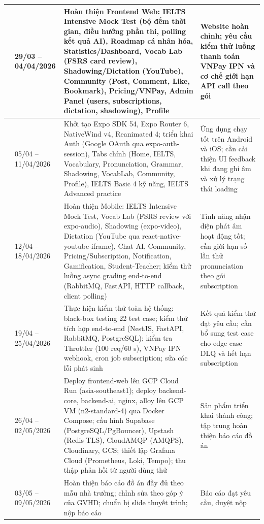 \begin{longtable}{|>{\centering\arraybackslash}p{15\tbu}|p{28\tbu}|p{62\tbu}|p{40\tbu}|}
    10 & 29/03 -- 04/04/2026 & Hoàn thiện Frontend Web: IELTS Intensive Mock Test (bộ đếm thời gian, điều hướng phần thi, polling kết quả AI), Roadmap cá nhân hóa, Statistics/Dashboard, Vocab Lab (FSRS card review), Shadowing/Dictation (YouTube), Community (Post, Comment, Like, Bookmark), Pricing/VNPay, Admin Panel (users, subscriptions, dictation, shadowing), Profile & Website hoàn chỉnh; yêu cầu kiểm thử luồng thanh toán VNPay IPN và cơ chế giới hạn API call theo gói \\ \hline
    11 & 05/04 -- 11/04/2026 & Khởi tạo Expo SDK 54, Expo Router 6, NativeWind v4, Reanimated 4; triển khai Auth (Google OAuth qua expo-auth-session), Tabs chính (Home, IELTS, Vocabulary, Pronunciation, Grammar, Shadowing, VocabLab, Community, Profile), IELTS Basic 4 kỹ năng, IELTS Advanced practice & Ứng dụng chạy tốt trên Android và iOS; cần cải thiện UI feedback khi đang ghi âm và xử lý trạng thái loading \\ \hline
    12 & 12/04 -- 18/04/2026 & Hoàn thiện Mobile: IELTS Intensive Mock Test, Vocab Lab (FSRS review với expo-audio), Shadowing (expo-video), Dictation (YouTube qua react-native-youtube-iframe), Chat AI, Community, Pricing/Subscription, Notification, Gamification, Student-Teacher; kiểm thử luồng async grading end-to-end (RabbitMQ, FastAPI, HTTP callback, client polling) & Tính năng nhận diện phát âm hoạt động tốt; cần giới hạn số lần thử pronunciation theo gói subscription \\ \hline
    13 & 19/04 -- 25/04/2026 & Thực hiện kiểm thử toàn hệ thống: black-box testing 22 test case; kiểm thử tích hợp end-to-end (NestJS, FastAPI, RabbitMQ, PostgreSQL); kiểm tra Throttler (100 req/60 s), VNPay IPN webhook, cron job subscription; sửa các lỗi phát sinh & Kết quả kiểm thử đạt yêu cầu; cần bổ sung test case cho edge case DLQ và hết hạn subscription \\ \hline
    14 & 26/04 -- 02/05/2026 & Deploy frontend-web lên GCP Cloud Run (asia-southeast1); deploy backend-core, backend-ai, nginx, alloy lên GCP VM (n2-standard-4) qua Docker Compose; cấu hình Supabase (PostgreSQL/PgBouncer), Upstash (Redis TLS), CloudAMQP (AMQPS), Cloudinary, GCS; thiết lập Grafana Cloud (Prometheus, Loki, Tempo); thu thập phản hồi từ người dùng thử & Sản phẩm triển khai thành công; tập trung hoàn thiện báo cáo đồ án \\ \hline
    15 & 03/05 -- 09/05/2026 & Hoàn thiện báo cáo đồ án đầy đủ theo mẫu nhà trường; chỉnh sửa theo góp ý của GVHD; chuẩn bị slide thuyết trình; nộp báo cáo & Báo cáo đạt yêu cầu, duyệt nộp \\ \hline
\end{longtable}
